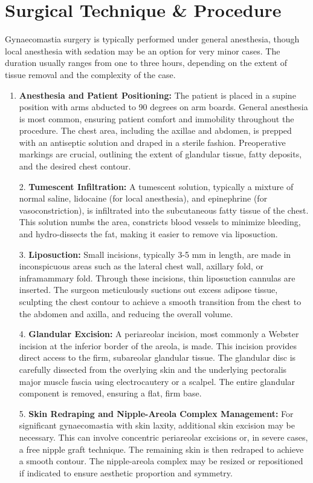 \section*{Surgical Technique \& Procedure}
Gynaecomastia surgery is typically performed under general anesthesia, though local anesthesia with sedation may be an option for very minor cases. The duration usually ranges from one to three hours, depending on the extent of tissue removal and the complexity of the case.

\begin{enumerate}
  \item  \textbf{Anesthesia and Patient Positioning:} The patient is placed in a supine position with arms abducted to 90 degrees on arm boards. General anesthesia is most common, ensuring patient comfort and immobility throughout the procedure. The chest area, including the axillae and abdomen, is prepped with an antiseptic solution and draped in a sterile fashion. Preoperative markings are crucial, outlining the extent of glandular tissue, fatty deposits, and the desired chest contour.

  2.  \textbf{Tumescent Infiltration:} A tumescent solution, typically a mixture of normal saline, lidocaine (for local anesthesia), and epinephrine (for vasoconstriction), is infiltrated into the subcutaneous fatty tissue of the chest. This solution numbs the area, constricts blood vessels to minimize bleeding, and hydro-dissects the fat, making it easier to remove via liposuction.

  3.  \textbf{Liposuction:} Small incisions, typically 3-5 mm in length, are made in inconspicuous areas such as the lateral chest wall, axillary fold, or inframammary fold. Through these incisions, thin liposuction cannulas are inserted. The surgeon meticulously suctions out excess adipose tissue, sculpting the chest contour to achieve a smooth transition from the chest to the abdomen and axilla, and reducing the overall volume.

  4.  \textbf{Glandular Excision:} A periareolar incision, most commonly a Webster incision at the inferior border of the areola, is made. This incision provides direct access to the firm, subareolar glandular tissue. The glandular disc is carefully dissected from the overlying skin and the underlying pectoralis major muscle fascia using electrocautery or a scalpel. The entire glandular component is removed, ensuring a flat, firm base.

  5.  \textbf{Skin Redraping and Nipple-Areola Complex Management:} For significant gynaecomastia with skin laxity, additional skin excision may be necessary. This can involve concentric periareolar excisions or, in severe cases, a free nipple graft technique. The remaining skin is then redraped to achieve a smooth contour. The nipple-areola complex may be resized or repositioned if indicated to ensure aesthetic proportion and symmetry.


\end{enumerate}

